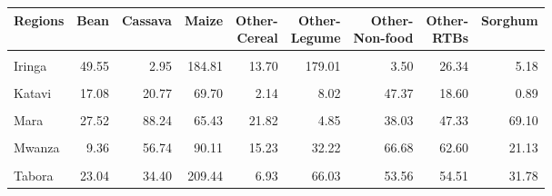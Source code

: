 \begin{table}[!h]
\centering\begingroup\fontsize{7}{9}\selectfont

\begin{tabular}{>{\raggedright\arraybackslash}p{1.8cm}rrrrrrrr}
\toprule
Regions & Bean & Cassava & Maize & \makecell{Other-\\Cereal} & \makecell{Other-\\Legume} & \makecell{Other-\\Non-food} & \makecell{Other-\\RTBs} & Sorghum\\
\midrule
\cellcolor{gray!10}{Geita} & \cellcolor{gray!10}{61.62} & \cellcolor{gray!10}{81.38} & \cellcolor{gray!10}{140.31} & \cellcolor{gray!10}{15.57} & \cellcolor{gray!10}{33.46} & \cellcolor{gray!10}{55.71} & \cellcolor{gray!10}{79.03} & \cellcolor{gray!10}{5.21}\\
Iringa & 49.55 & 2.95 & 184.81 & 13.70 & 179.01 & 3.50 & 26.34 & 5.18\\
\cellcolor{gray!10}{Kagera} & \cellcolor{gray!10}{102.26} & \cellcolor{gray!10}{82.45} & \cellcolor{gray!10}{89.30} & \cellcolor{gray!10}{35.70} & \cellcolor{gray!10}{22.96} & \cellcolor{gray!10}{89.08} & \cellcolor{gray!10}{55.95} & \cellcolor{gray!10}{42.02}\\
Katavi & 17.08 & 20.77 & 69.70 & 2.14 & 8.02 & 47.37 & 18.60 & 0.89\\
\cellcolor{gray!10}{Kigoma} & \cellcolor{gray!10}{119.90} & \cellcolor{gray!10}{51.83} & \cellcolor{gray!10}{169.76} & \cellcolor{gray!10}{2.62} & \cellcolor{gray!10}{25.52} & \cellcolor{gray!10}{10.77} & \cellcolor{gray!10}{37.86} & \cellcolor{gray!10}{11.38}\\
\addlinespace
Mara & 27.52 & 88.24 & 65.43 & 21.82 & 4.85 & 38.03 & 47.33 & 69.10\\
\cellcolor{gray!10}{Mbeya} & \cellcolor{gray!10}{73.37} & \cellcolor{gray!10}{5.62} & \cellcolor{gray!10}{183.11} & \cellcolor{gray!10}{10.51} & \cellcolor{gray!10}{34.35} & \cellcolor{gray!10}{30.19} & \cellcolor{gray!10}{65.01} & \cellcolor{gray!10}{16.78}\\
Mwanza & 9.36 & 56.74 & 90.11 & 15.23 & 32.22 & 66.68 & 62.60 & 21.13\\
\cellcolor{gray!10}{Songwe} & \cellcolor{gray!10}{36.22} & \cellcolor{gray!10}{8.65} & \cellcolor{gray!10}{126.95} & \cellcolor{gray!10}{14.15} & \cellcolor{gray!10}{13.00} & \cellcolor{gray!10}{23.79} & \cellcolor{gray!10}{24.90} & \cellcolor{gray!10}{17.15}\\
Tabora & 23.04 & 34.40 & 209.44 & 6.93 & 66.03 & 53.56 & 54.51 & 31.78\\
\bottomrule
\end{tabular}
\endgroup{}
\end{table}
